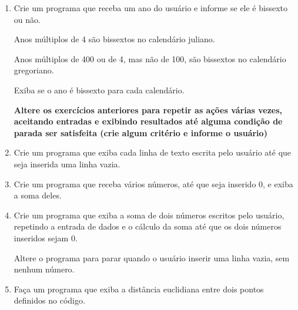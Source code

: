 \begin{enumerate}
\begin{multicols}{2}
		\begin{equation*}
			K = C + 273,16
		\end{equation*}
		
		\begin{equation*}
			F = 1,8(K - 273,16) + 32
		\end{equation*}
		
		\begin{equation*}
			K = \frac{F-32}{1,8} + 273,16 
		\end{equation*}
	\end{multicols}
	
	Inclua também no programa a exibição de se a água destilada a 1 atm (pressão do nível do mar) estaria sólida ($< 0^\circ C$), líquida ($> 0^\circ C$ e $< 100^\circ C$), gasosa ($> 100^\circ C$) ou se estaria em algum dos pontos de transição de estado.  	

	\item Crie um programa que receba um ano do usuário e informe se ele é bissexto ou não.
	
	Anos múltiplos de 4 são bissextos no calendário juliano.
	
	Anos múltiplos de 400 ou de 4, mas não de 100, são bissextos no calendário gregoriano.
	
	Exiba se o ano é bissexto para cada calendário.
	
	
\textbf{Altere os exercícios anteriores para repetir as ações várias vezes, aceitando entradas e exibindo resultados até alguma condição de parada ser satisfeita (crie algum critério e informe o usuário)}

\quebra	
	
	\item Crie um programa que exiba cada linha de texto escrita pelo usuário até que seja inserida uma linha vazia.
	
	\item Crie um programa que receba vários números, até que seja inserido 0, e exiba a soma deles.
	
	\item Crie um programa que exiba a soma de dois números escritos pelo usuário, repetindo a entrada de dados e o cálculo da soma até que os dois números inseridos sejam 0.
	
	Altere o programa para parar quando o usuário inserir uma linha vazia, sem nenhum número.		
	
\quebra	

	\item Faça um programa que exiba a distância euclidiana entre dois pontos definidos no código.
	

\end{enumerate}
